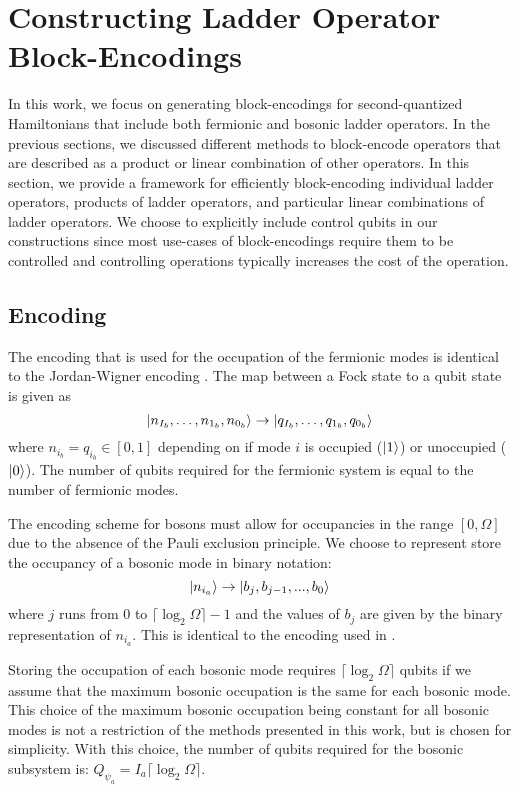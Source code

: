 \section{Constructing Ladder Operator Block-Encodings}
\label{sec:ladder-op-oracles}

In this work, we focus on generating block-encodings for second-quantized Hamiltonians that include both fermionic and bosonic ladder operators.
In the previous sections, we discussed different methods to block-encode operators that are described as a product or linear combination of other operators.
In this section, we provide a framework for efficiently block-encoding individual ladder operators, products of ladder operators, and particular linear combinations of ladder operators.
We choose to explicitly include control qubits in our constructions since most use-cases of block-encodings require them to be controlled and controlling operations typically increases the cost of the operation.

\subsection{Encoding}
\label{subsec:encoding}

The encoding that is used for the occupation of the fermionic modes is identical to the Jordan-Wigner encoding \cite{jordan-wigner}.
The map between a Fock state to a qubit state is given as 
\begin{equation}
    \ket{n_{I_b}, \dots, n_{1_b}, n_{0_b}} \rightarrow \ket{q_{I_b}, \dots, q_{1_b}, q_{0_b}}
\end{equation}
where $n_{i_b} = q_{i_b} \in [0, 1]$ depending on if mode $i$ is occupied ($\ket{1}$) or unoccupied ($\ket{0}$).
The number of qubits required for the fermionic system is equal to the number of fermionic modes.

The encoding scheme for bosons must allow for occupancies in the range $[0, \Omega]$ due to the absence of the Pauli exclusion principle.
We choose to represent store the occupancy of a bosonic mode in binary notation: 
\begin{equation}
    \ket{n_{i_a}} \rightarrow \ket{b_j, b_{j-1}, ..., b_0}
\end{equation}
where $j$ runs from $0$ to $\lceil \log_2{\Omega} \rceil - 1$ and the values of $b_j$ are given by the binary representation of $n_{i_a}$.
This is identical to the encoding used in \cite{rhodes2024exponential}. 

Storing the occupation of each bosonic mode requires $\lceil \log_2{\Omega} \rceil$ qubits if we assume that the maximum bosonic occupation is the same for each bosonic mode.
This choice of the maximum bosonic occupation being constant for all bosonic modes is not a restriction of the methods presented in this work, but is chosen for simplicity. 
With this choice, the number of qubits required for the bosonic subsystem is: $Q_{\psi_a} = I_a \lceil \log_2{\Omega} \rceil$.

